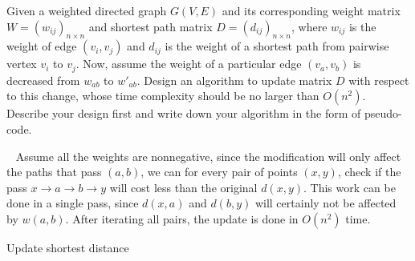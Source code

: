 \begin{exercise}[]
\begin{solution}
  

  \end{solution}
  \label{ex3}
\end{exercise}


\begin{exercise}[]{Given a weighted directed graph $G(V, E)$ and its corresponding weight matrix $W=(w_{ij})_{n \times n}$ and shortest path matrix $D=(d_{ij})_{n \times n}$, where $w_{ij}$ is the weight of edge $(v_i, v_j)$ and $d_{ij}$ is the weight of a shortest path from pairwise vertex $v_i$ to $v_j$. Now, assume the weight of a particular edge $(v_a, v_b)$ is decreased from $w_{ab}$ to $w'_{ab}$. Design an algorithm to update matrix $D$ with respect to this change, whose time complexity should be no larger than $O(n^2)$. Describe your design first and write down your algorithm in the form of pseudo-code.}
  \begin{solution}
  \par{~}
  Assume all the weights are nonnegative, since the modification will only affect the paths that pass $(a,b)$, we can for every pair of points $(x,y)$, check if the pass $x\rightarrow a \rightarrow b \rightarrow y$ will cost less than the original $d(x,y)$. This work can be done in a single pass, since $d(x,a)$ and $d(b,y)$ will certainly not be affected by $w(a,b)$. After iterating all pairs, the update is done in $O(n^2)$ time.

  \begin{algorithm}[H]
    \BlankLine
    \caption{Update shortest distance}
  \end{algorithm}
  
  \end{solution}
  \label{ex4}
\end{exercise}


